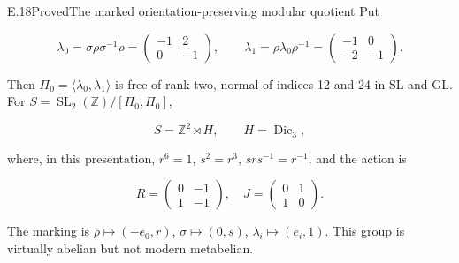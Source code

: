 \begin{statement}{E.18}{Proved}{The marked orientation-preserving modular quotient}
Put

$$
\lambda_0=\sigma\rho\sigma^{-1}\rho=
 \begin{pmatrix}-1&2\\0&-1\end{pmatrix},\qquad
 \lambda_1=\rho\lambda_0\rho^{-1}=
 \begin{pmatrix}-1&0\\-2&-1\end{pmatrix}.
$$

Then $\Pi_0=\langle\lambda_0,\lambda_1\rangle$ is free
of rank two, normal of indices 12 and 24 in SL and GL.
For $S=\operatorname{SL}_2(\mathbb Z)/[\Pi_0,\Pi_0]$,

$$
S=\mathbb Z^2\rtimes H,\qquad H=\operatorname{Dic}_3,
$$

where, in this presentation, $r^6=1$, $s^2=r^3$,
$srs^{-1}=r^{-1}$, and the action is

$$
R=\begin{pmatrix}0&-1\\1&-1\end{pmatrix},\quad
 J=\begin{pmatrix}0&1\\1&0\end{pmatrix}.
$$

The marking is $\rho\mapsto(-e_0,r)$, $\sigma\mapsto(0,s)$,
$\lambda_i\mapsto(e_i,1)$. This group is virtually
abelian but not modern metabelian.
\end{statement}
